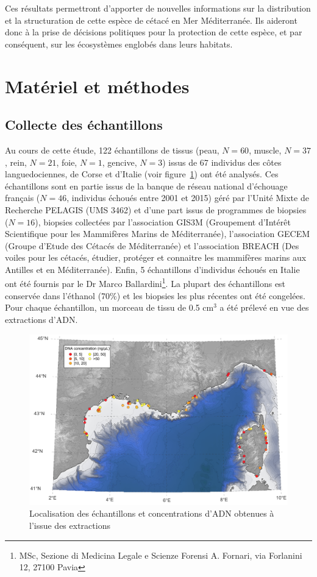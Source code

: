 \documentclass[a4paper,12pt,twoside]{article}\usepackage[]{graphicx}\usepackage[]{color}
\begin{document}
\begin {bibunit} [newbst]
Ces résultats permettront d'apporter de nouvelles informations sur la distribution et la structuration de cette espèce de cétacé en Mer Méditerranée. Ils aideront donc à la prise de décisions politiques pour la protection de cette espèce, et par conséquent, sur les écosystèmes englobés dans leurs habitats.


\section{Matériel et méthodes} 

\subsection{Collecte des échantillons} 
Au cours de cette étude, 122 échantillons de tissus (peau, $N= 60$, muscle, $N= 37$, rein, $N= 21$, foie, $N= 1$, gencive, $N= 3$) issus de 67 individus des côtes languedociennes, de Corse et d'Italie (voir figure~\ref{fig:concentration}) ont été analysés. Ces échantillons sont en partie issus de la banque de réseau national d'échouage français ($N= 46$, individus échoués entre 2001 et 2015) géré par l'Unité Mixte de Recherche PELAGIS (UMS 3462) et d'une part issus de programmes de biopsies ($N= 16$), biopsies collectées par l'association GIS3M (Groupement d'Intérêt Scientifique pour les Mammifères Marins de Méditerranée), l'association GECEM (Groupe d'Etude des Cétacés de Méditerranée) et l'association BREACH (Des voiles pour les cétacés, étudier, protéger et connaitre les mammifères marins aux Antilles et en Méditerranée). Enfin, 5 échantillons d'individus échoués en Italie ont été fournis par le Dr Marco Ballardini\footnote{MSc, Sezione di Medicina Legale e Scienze Forensi A. Fornari, via Forlanini 12, 27100 Pavia}. La plupart des échantillons est conservée dans l'éthanol (70\%) et les biopsies les plus récentes ont été congelées. Pour chaque échantillon, un morceau de tissu de 0.5 cm$^3$ a été prélevé en vue des extractions d'ADN.

\begin{figure}[htbp]
	\centering
		\includegraphics[width=\textwidth]{concentrations.png}
	\caption{Localisation des échantillons et concentrations d'ADN obtenues à l'issue des extractions}
	\label{fig:concentration}
\end{figure}



\end{bibunit}
\end{document}
